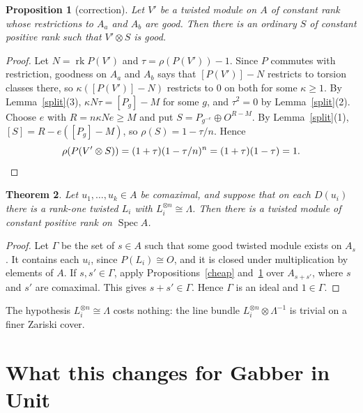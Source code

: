 \documentclass[11pt]{amsart}
\newtheorem{theorem}{Theorem}[section]
\newtheorem{proposition}[theorem]{Proposition}
\theoremstyle{definition}
\theoremstyle{remark}
\newcommand{\Spec}{\operatorname{Spec}}
\newcommand{\rk}{\operatorname{rk}}
\begin{document}
\begin{proposition}[correction]\label{correct}
Let $V'$ be a twisted module on $A$ of constant rank whose restrictions to
$A_a$ and $A_b$ are good. Then there is an ordinary $S$ of constant positive
rank such that $V'\otimes S$ is good.
\end{proposition}
\begin{proof}
Let $N=\rk P(V')$ and $\tau=\rho(P(V'))-1$. Since $P$ commutes with
restriction, goodness on $A_a$ and $A_b$ says that $[P(V')]-N$ restricts to
torsion classes there, so $\kappa([P(V')]-N)$ restricts to $0$ on both for
some $\kappa\ge1$. By Lemma~\ref{split}(3), $\kappa N\tau=[P_g]-M$ for some
$g$, and $\tau^2=0$ by
Lemma~\ref{split}(2). Choose $e$ with $R=n\kappa Ne\geq M$ and put
$S=P_{g^{-e}}\oplus O^{R-M}$. By Lemma~\ref{split}(1),
$[S]=R-e([P_g]-M)$, so $\rho(S)=1-\tau/n$. Hence
\[\rho(P(V'\otimes S))=(1+\tau)(1-\tau/n)^n=(1+\tau)(1-\tau)=1.\qedhere\]
\end{proof}

\begin{theorem}\label{main}
Let $u_1,\dots,u_k\in A$ be comaximal, and suppose that on each $D(u_i)$
there is a rank-one twisted $L_i$ with $L_i^{\otimes n}\cong\Lambda$. Then
there is a twisted module of constant positive rank on $\Spec A$.
\end{theorem}
\begin{proof}
Let $\Gamma$ be the set of $s\in A$ such that some good twisted module
exists on $A_s$. It contains each $u_i$, since $P(L_i)\cong O$, and it is
closed under multiplication by elements of $A$. If $s,s'\in\Gamma$, apply
Propositions~\ref{cheap} and~\ref{correct} over $A_{s+s'}$, where $s$ and
$s'$ are comaximal. This gives $s+s'\in\Gamma$. Hence $\Gamma$ is an ideal
and $1\in\Gamma$.
\end{proof}

The hypothesis $L_i^{\otimes n}\cong\Lambda$ costs nothing: the line bundle
$L_i^{\otimes n}\otimes\Lambda^{-1}$ is trivial on a finer Zariski cover.

\section{What this changes for Gabber in Unit}
\end{document}
